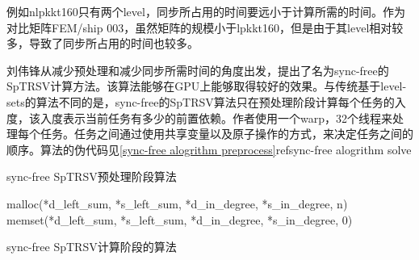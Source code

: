 例如nlpkkt160只有两个level，同步所占用的时间要远小于计算所需的时间。作为对比矩阵FEM/ship 003，虽然矩阵的规模小于lpkkt160，但是由于其level相对较多，导致了同步所占用的时间也较多。

刘伟锋从减少预处理和减少同步所需时间的角度出发，提出了名为sync-free的SpTRSV计算方法\cite{liuSyncFree2016}。该算法能够在GPU上能够取得较好的效果。与传统基于level-sets的算法不同的是，sync-free的SpTRSV算法只在预处理阶段计算每个任务的入度，该入度表示当前任务有多少的前置依赖。作者使用一个warp，32个线程来处理每个任务。任务之间通过使用共享变量以及原子操作的方式，来决定任务之间的顺序。算法的伪代码见\ref{sync-free alogrithm preprocess}ref{sync-free alogrithm solve}

\begin{algorithm}[htbp]
    \caption{sync-free SpTRSV预处理阶段算法}
    \label{sync-free alogrithm preprocess}
    malloc(*d\_left\_sum, *s\_left\_sum, *d\_in\_degree, *s\_in\_degree, n)\;
    memset(*d\_left\_sum, *s\_left\_sum, *d\_in\_degree, *s\_in\_degree, 0)\;
\end{algorithm}

\begin{algorithm}[htbp]
    \caption{sync-free SpTRSV计算阶段的算法}
    \label{sync-free alogrithm solve}

    
\end{algorithm}

